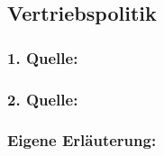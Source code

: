     \subsection{Vertriebspolitik}
        \subsubsection*{1. Quelle:}
        \begin{abstract}
        \end{abstract}
        \subsubsection*{2. Quelle:}
        \begin{abstract}
        \end{abstract}
        \subsubsection*{Eigene Erläuterung:}
        \begin{abstract}
        \end{abstract}
    